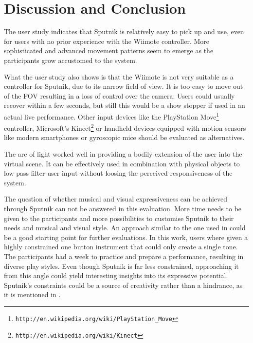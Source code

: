 \documentclass[10pt,a4paper]{scrartcl}
\begin{document}
\section{Discussion and Conclusion}
\label{sec:discussion}

The user study indicates that Sputnik is relatively easy to pick up and use, even for users with no prior experience with the Wiimote controller. More sophisticated and advanced movement patterns seem to emerge as the participants grow accustomed to the system.

What the user study also shows is that the Wiimote is not very suitable as a controller for Sputnik, due to its narrow field of view. It is too easy to move out of the FOV resulting in a loss of control over the camera. Users could usually recover within a few seconds, but still this would be a show stopper if used in an actual live performance. Other input devices like the PlayStation Move\footnote{\texttt{http://en.wikipedia.org/wiki/PlayStation\_Move}} controller, Microsoft's Kinect\footnote{\texttt{http://en.wikipedia.org/wiki/Kinect}} or handheld devices equipped with motion sensors like modern smartphones or gyroscopic mice should be evaluated as alternatives.

The arc of light worked well in providing a bodily extension of the user into the virtual scene. It can be effectively used in combination with physical objects to low pass filter user input without loosing the perceived responsiveness of the system.

	
The question of whether musical and visual expressiveness can be achieved through Sputnik can not be answered in this evaluation. More time needs to be given to the participants and more possibilities to customise Sputnik to their needs and musical and visual style. An approach similar to the one used in \cite{Gurevich2010} could be a good starting point for further evaluations. In this work, users where given a highly constrained one button instrument that could only create a single tone. The participants had a week to practice and prepare a performance, resulting in  diverse play styles. Even though Sputnik is far less constrained, approaching it from this angle could yield interesting insights into its expressive potential. Sputnik's constraints could be a source of creativity rather than a hindrance, as it is mentioned in \cite{Magnusson2010}. 
\end{document}
